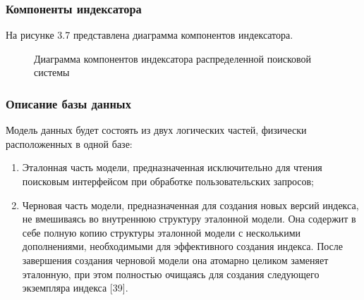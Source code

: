 \subsubsection{Компоненты индексатора}

На рисунке 3.7 представлена диаграмма компонентов индексатора.

\begin{figure}[H]
\caption{Диаграмма компонентов индексатора распределенной поисковой системы}
\label{indexer/diagram_components:image}
\end{figure}

\subsubsection{Описание базы данных}

Модель данных будет состоять из двух логических частей, физически расположенных в одной базе:
\begin{enumerate}
\item Эталонная часть модели, предназначенная исключительно для чтения поисковым интерфейсом при обработке пользовательских запросов;
\item Черновая часть модели, предназначенная для создания новых версий индекса, не вмешиваясь во внутреннюю структуру эталонной модели. Она содержит в себе полную копию структуры эталонной модели с несколькими дополнениями, необходимыми для эффективного создания индекса. После завершения создания черновой модели она атомарно целиком заменяет эталонную, при этом полностью очищаясь для создания следующего экземпляра индекса [39].
\end{enumerate}

